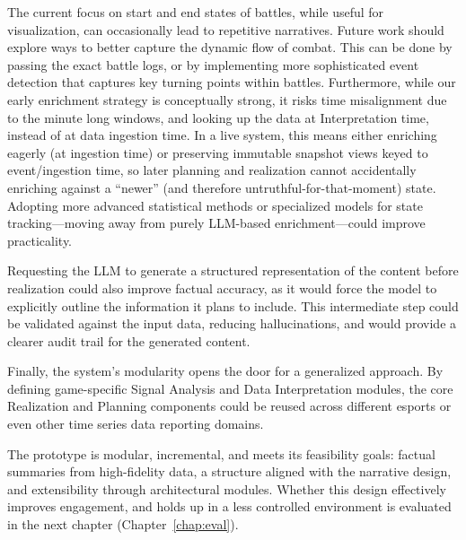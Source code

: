 The current focus on start and end states of battles, while useful for visualization, can occasionally lead to repetitive narratives. Future work should explore ways to better capture the dynamic flow of combat. This can be done by passing the exact battle logs, or by implementing more sophisticated event detection that captures key turning points within battles.
Furthermore, while our early enrichment strategy is conceptually strong, it risks time misalignment due to the minute long windows, and looking up the data at Interpretation time, instead of at data ingestion time. In a live system, this means either enriching eagerly (at ingestion time) or preserving immutable snapshot views keyed to event/ingestion time, so later planning and realization cannot accidentally enriching against a ``newer'' (and therefore untruthful-for-that-moment) state. Adopting more advanced statistical methods or specialized models for state tracking—moving away from purely LLM-based enrichment—could improve practicality.

Requesting the LLM to generate a structured representation of the content before realization could also improve factual accuracy, as it would force the model to explicitly outline the information it plans to include. This intermediate step could be validated against the input data, reducing hallucinations, and would provide a clearer audit trail for the generated content.

Finally, the system's modularity opens the door for a generalized approach. By defining game-specific Signal Analysis and Data Interpretation modules, the core Realization and Planning components could be reused across different esports or even other time series data reporting domains.

The prototype is modular, incremental, and meets its feasibility goals: factual summaries from high-fidelity data, a structure aligned with the narrative design, and extensibility through architectural modules. Whether this design effectively improves engagement, and holds up in a less controlled environment is evaluated in the next chapter (Chapter~\ref{chap:eval}).